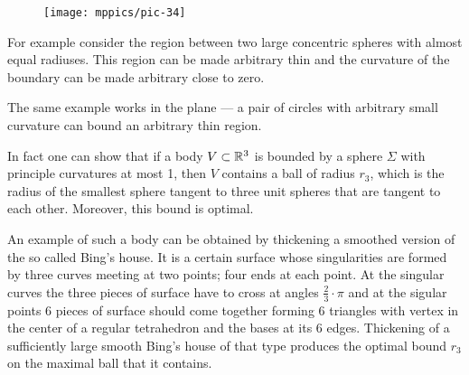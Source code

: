 \begin{wrapfigure}{o}{33 mm}
\vskip-4mm
\centering
\texttt{[image: mppics/pic-34]}
\vskip0mm
\end{wrapfigure}

For example consider the region between two large concentric spheres with almost equal radiuses. 
This region can be made arbitrary thin and the curvature of the boundary can be made arbitrary close to zero.

The same example works in the plane --- a pair of circles with arbitrary small curvature can bound an arbitrary thin region.

In fact one can show that if a body $V\subset \mathbb{R}^3$ is bounded by a sphere $\Sigma$ with principle curvatures at most 1, then $V$ contains a ball of radius $r_3$,
which is the radius of the smallest sphere tangent to three unit spheres that are tangent to each other.
Moreover, this bound is optimal.

An example of such a body can be obtained by thickening a smoothed version of the so called Bing's house.
It is a certain surface whose singularities are formed by three curves meeting at two points;
four ends at each point.
At the singular curves the three pieces of surface have to cross at angles $\tfrac23\cdot\pi$ and at the sigular points 6 pieces of surface should come together forming 6 triangles with vertex in the center of a regular tetrahedron and the bases at its 6 edges.
Thickening of a sufficiently large smooth Bing's house of that type produces the optimal bound $r_3$ on the maximal ball that it contains.





